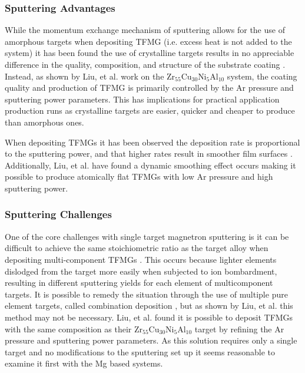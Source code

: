 \documentclass[a4paper,12pt,oneside]{report}%
\begin{document}
\subsubsection{Sputtering Advantages}
While the momentum exchange mechanism of sputtering allows for the use of amorphous targets when depositing TFMG (i.e. excess heat is not added to the system) it has been found the use of crystalline targets results in no appreciable difference in the quality, composition, and structure of the substrate coating \cite{Liu2012}. Instead, as shown by Liu, et al. \cite{Liu2012} work on the Zr$_{55}$Cu$_{30}$Ni$_{5}$Al$_{10}$ system, the coating quality and production of TFMG is primarily controlled by the Ar pressure and sputtering power parameters. This has implications for practical application production runs as crystalline targets are easier, quicker and cheaper to produce than amorphous ones. 

When depositing TFMGs it has been observed the deposition rate is proportional to the sputtering power, and that higher rates result in smoother film surfaces \cite{Cao2013, Liu2012}. Additionally, Liu, et al. \cite{Liu2012} have found a dynamic smoothing effect occurs making it possible to produce atomically flat TFMGs with low Ar pressure and high sputtering power. 

\subsubsection{Sputtering Challenges}
One of the core challenges with single target magnetron sputtering is it can be difficult to achieve the same stoichiometric ratio as the target alloy when depositing multi-component TFMGs \cite{Cao2013, Liu2012, Kondoh2008}. This occurs because lighter elements dislodged from the target more easily when subjected to ion bombardment, resulting in different sputtering yields for each element of multicomponent targets. It is possible to remedy the situation through the use of multiple pure element targets, called combination deposition \cite{Deng2007, Qin2009, Apreutesei2014}, but as shown by Liu, et al. \cite{Liu2012} this method may not be necessary. Liu, et al. \cite{Liu2012} found it is possible to deposit TFMGs with the same composition as their Zr$_{55}$Cu$_{30}$Ni$_{5}$Al$_{10}$ target by refining the Ar pressure and sputtering power parameters. As this solution requires only a single target and no modifications to the sputtering set up it seems reasonable to examine it first with the Mg based systems.   
\end{document}
